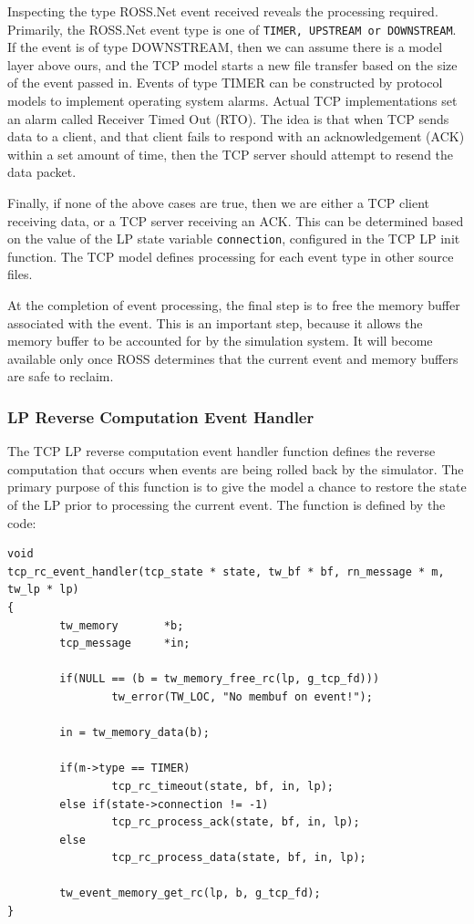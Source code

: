 \documentclass[conference,onecolumn]{IEEEtran}
\begin{document}
Inspecting the type ROSS.Net event received reveals the processing required.  Primarily, the ROSS.Net event type is one of {\tt TIMER, UPSTREAM or DOWNSTREAM}.  If the event is of type DOWNSTREAM, then we can assume there is a model layer above ours, and the TCP model starts a new file transfer based on the size of the event passed in.  Events of type TIMER can be constructed by protocol models to implement operating system alarms.  Actual TCP implementations set an alarm called Receiver Timed Out (RTO).  The idea is that when TCP sends data to a client, and that client fails to respond with an acknowledgement (ACK) within a set amount of time, then the TCP server should attempt to resend the data packet.  

Finally, if none of the above cases are true, then we are either a TCP client receiving data, or a TCP server receiving an ACK.  This can be determined based on the value of the LP state variable {\tt connection}, configured in the TCP LP init function.  The TCP model defines processing for each event type in other source files.

At the completion of event processing, the final step is to free the memory buffer associated with the event.  This is an important step, because it allows the memory buffer to be accounted for by the simulation system.  It will become available only once ROSS determines that the current event and memory buffers are safe to reclaim.

\subsubsection{LP Reverse Computation Event Handler}

The TCP LP reverse computation event handler function defines the reverse computation that occurs when events are being rolled back by the simulator.  The primary purpose of this function is to give the model a chance to restore the state of the LP prior to processing the current event.  The function is defined by the code:

\begin{small}\begin{verbatim}
void
tcp_rc_event_handler(tcp_state * state, tw_bf * bf, rn_message * m, tw_lp * lp)
{
        tw_memory       *b;
        tcp_message     *in;

        if(NULL == (b = tw_memory_free_rc(lp, g_tcp_fd)))
                tw_error(TW_LOC, "No membuf on event!");

        in = tw_memory_data(b);

        if(m->type == TIMER)
                tcp_rc_timeout(state, bf, in, lp);
        else if(state->connection != -1)
                tcp_rc_process_ack(state, bf, in, lp);
        else
                tcp_rc_process_data(state, bf, in, lp);

        tw_event_memory_get_rc(lp, b, g_tcp_fd);
}
\end{verbatim}\end{small}
\end{document}
